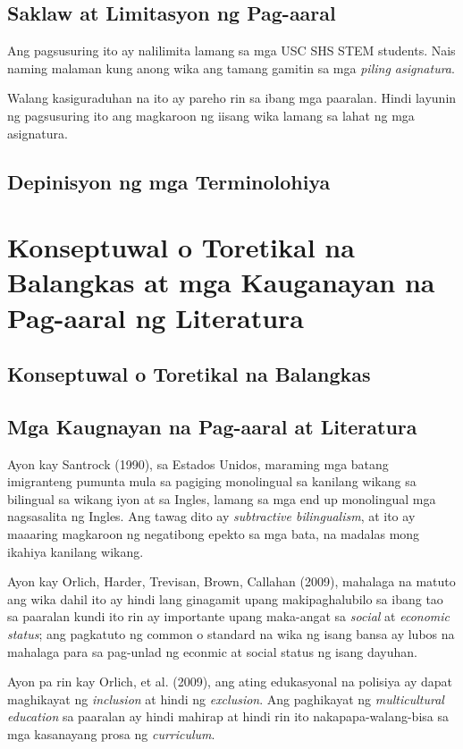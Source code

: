 \documentclass [11pt] {report}
\begin{document}
\pagebreak
\section {Saklaw at Limitasyon ng Pag-aaral}
Ang pagsusuring ito ay nalilimita lamang sa mga USC SHS STEM students. Nais
naming malaman kung anong wika ang tamang gamitin sa mga \emph{piling
  asignatura}.

Walang kasiguraduhan na ito ay pareho rin sa ibang mga paaralan. Hindi layunin
ng pagsusuring ito ang magkaroon ng iisang wika lamang sa lahat ng mga
asignatura.

\section{Depinisyon ng mga Terminolohiya}

\chapter{Konseptuwal o Toretikal na Balangkas at mga Kauganayan na Pag-aaral ng Literatura}
\section {Konseptuwal o Toretikal na Balangkas}
\pagebreak
\section {Mga Kaugnayan na Pag-aaral at Literatura}
Ayon kay Santrock (1990), sa Estados Unidos, maraming mga batang imigranteng
pumunta mula sa pagiging monolingual sa kanilang wikang sa bilingual sa wikang
iyon at sa Ingles, lamang sa mga end up monolingual mga nagsasalita ng Ingles.
Ang tawag dito ay \emph{subtractive bilingualism}, at ito ay maaaring magkaroon
ng negatibong epekto sa mga bata, na madalas mong ikahiya kanilang wikang.

Ayon kay Orlich, Harder, Trevisan, Brown, Callahan (2009), mahalaga na matuto ang
wika dahil ito ay hindi lang ginagamit upang makipaghalubilo sa ibang tao sa
paaralan kundi ito rin ay importante upang maka-angat sa \emph{social} at
\emph{economic status}; ang pagkatuto ng common o standard na wika ng isang
bansa ay lubos na mahalaga para sa pag-unlad ng econmic at social status ng
isang dayuhan.

Ayon pa rin kay Orlich, et al. (2009), ang ating edukasyonal na polisiya ay
dapat maghikayat ng \emph{inclusion} at hindi ng \emph{exclusion}. Ang
paghikayat ng \emph{multicultural education} sa paaralan ay hindi mahirap at
hindi rin ito nakapapa-walang-bisa sa mga kasanayang prosa ng \emph{curriculum}.
\end{document}
